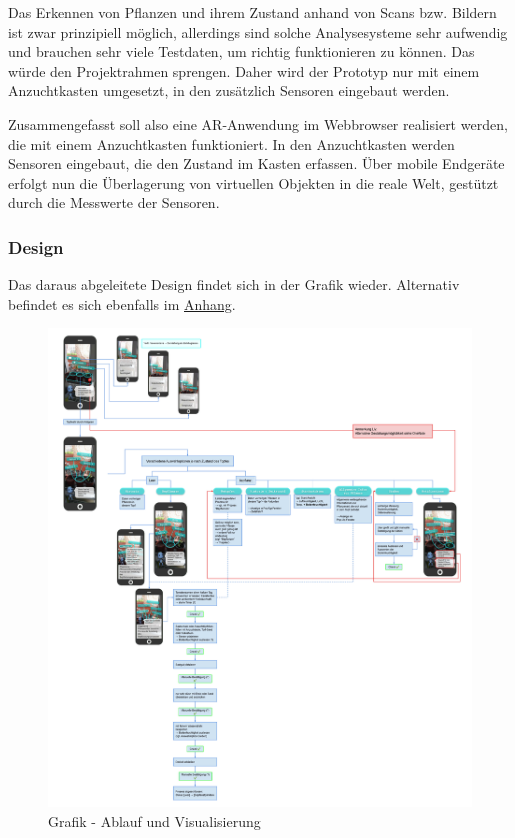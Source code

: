 Das Erkennen von Pflanzen und ihrem Zustand anhand von Scans bzw.
Bildern ist zwar prinzipiell möglich, allerdings sind solche
Analysesysteme sehr aufwendig und brauchen sehr viele Testdaten, um
richtig funktionieren zu können. Das würde den Projektrahmen sprengen.
Daher wird der Prototyp nur mit einem Anzuchtkasten umgesetzt, in den
zusätzlich Sensoren eingebaut werden.

Zusammengefasst soll also eine AR-Anwendung im Webbrowser realisiert
werden, die mit einem Anzuchtkasten funktioniert. In den Anzuchtkasten
werden Sensoren eingebaut, die den Zustand im Kasten erfassen. Über
mobile Endgeräte erfolgt nun die Überlagerung von virtuellen Objekten in
die reale Welt, gestützt durch die Messwerte der Sensoren.

\hypertarget{design}{%
\subsubsection{Design}\label{design}}

Das daraus abgeleitete Design findet sich in der Grafik wieder.
Alternativ befindet es sich ebenfalls im
\protect\hyperlink{anhang}{Anhang}.

\begin{figure}
\centering
\includegraphics{img/AblaufVisualisierung_kompr.jpg}
\caption{Grafik - Ablauf und Visualisierung}
\end{figure}


